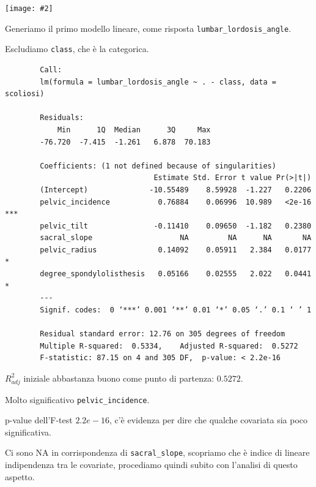 \documentclass{beamer}
\newcommand{\fg}[2]{%
  \begin{center}
      \texttt{[image: \#2]}%
  \end{center}
}
\begin{document}
\begin{frame}
	\fg{1}{00ggpairs_scoliosi}
\end{frame}



\begin{frame}[fragile]
	Generiamo il primo modello lineare, come risposta \texttt{lumbar\_lordosis\_angle}.
	
	Escludiamo \texttt{class}, che è la categorica.

	{\tiny
	\begin{verbatim}
		Call:
		lm(formula = lumbar_lordosis_angle ~ . - class, data = scoliosi)

		Residuals:
		    Min      1Q  Median      3Q     Max 
		-76.720  -7.415  -1.261   6.878  70.183 

		Coefficients: (1 not defined because of singularities)
		                          Estimate Std. Error t value Pr(>|t|)    
		(Intercept)              -10.55489    8.59928  -1.227   0.2206    
		pelvic_incidence           0.76884    0.06996  10.989   <2e-16 ***
		pelvic_tilt               -0.11410    0.09650  -1.182   0.2380    
		sacral_slope                    NA         NA      NA       NA    
		pelvic_radius              0.14092    0.05911   2.384   0.0177 *  
		degree_spondylolisthesis   0.05166    0.02555   2.022   0.0441 *  
		---
		Signif. codes:  0 ‘***’ 0.001 ‘**’ 0.01 ‘*’ 0.05 ‘.’ 0.1 ‘ ’ 1

		Residual standard error: 12.76 on 305 degrees of freedom
		Multiple R-squared:  0.5334,	Adjusted R-squared:  0.5272 
		F-statistic: 87.15 on 4 and 305 DF,  p-value: < 2.2e-16

	\end{verbatim}
	}
\end{frame}


\begin{frame}
	$R^2_{adj}$ iniziale abbastanza buono come punto di partenza: $0.5272$.

	Molto significativo \texttt{pelvic\_incidence}.

	p-value dell'F-test $2.2e-16$, c'è evidenza per dire che qualche covariata sia poco significativa.

	Ci sono NA in corrispondenza di \texttt{sacral\_slope}, scopriamo che è indice di lineare indipendenza tra le covariate, procediamo quindi subito con l'analisi di questo aspetto.
\end{frame}
\end{document}
